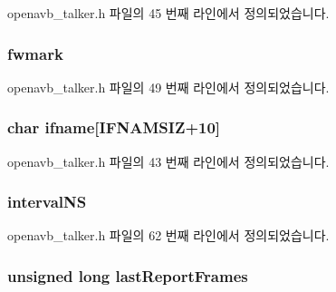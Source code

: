 openavb\+\_\+talker.\+h 파일의 45 번째 라인에서 정의되었습니다.

\subsubsection[{\texorpdfstring{fwmark}{fwmark}}]{ fwmark}\hypertarget{structtalker__data__t_a2feeac72308795682394e8b3796d9502}{}\label{structtalker__data__t_a2feeac72308795682394e8b3796d9502}


openavb\+\_\+talker.\+h 파일의 49 번째 라인에서 정의되었습니다.

\subsubsection[{\texorpdfstring{ifname}{ifname}}]{\setlength{\rightskip}{0pt plus 5cm}char ifname\mbox{[}{\bf I\+F\+N\+A\+M\+S\+IZ}+10\mbox{]}}\hypertarget{structtalker__data__t_a11d6071e5fa37b0c5776e17651485f11}{}\label{structtalker__data__t_a11d6071e5fa37b0c5776e17651485f11}


openavb\+\_\+talker.\+h 파일의 43 번째 라인에서 정의되었습니다.

\subsubsection[{\texorpdfstring{interval\+NS}{intervalNS}}]{ interval\+NS}\hypertarget{structtalker__data__t_a94f53f00878c9928b413df5a29abbe38}{}\label{structtalker__data__t_a94f53f00878c9928b413df5a29abbe38}


openavb\+\_\+talker.\+h 파일의 62 번째 라인에서 정의되었습니다.

\subsubsection[{\texorpdfstring{last\+Report\+Frames}{lastReportFrames}}]{\setlength{\rightskip}{0pt plus 5cm}unsigned long last\+Report\+Frames}\hypertarget{structtalker__data__t_afcd18ba6ccac35cfc976d61591b8a718}{}\label{structtalker__data__t_afcd18ba6ccac35cfc976d61591b8a718}


